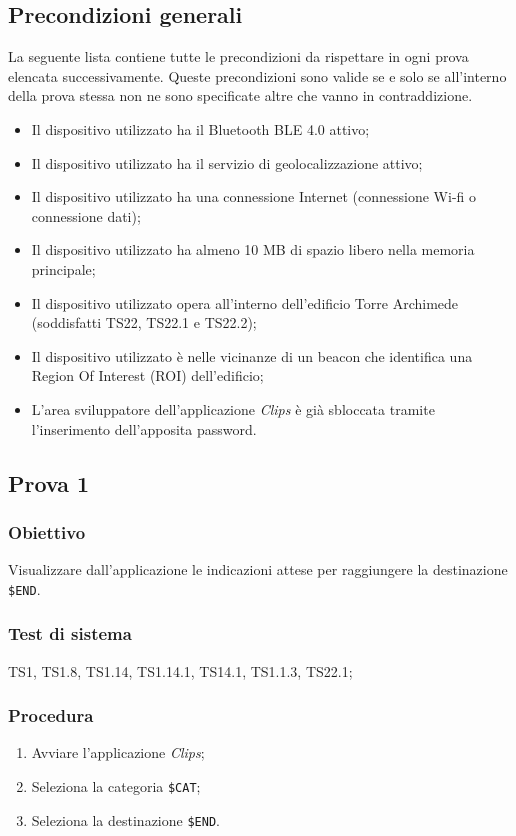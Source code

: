 \documentclass[../Sperimentazione.tex]{subfiles}
\begin{document}
\subsection{Precondizioni generali}
	La seguente lista contiene tutte le precondizioni da rispettare in ogni prova elencata successivamente. Queste precondizioni sono valide se e solo se all'interno della prova stessa non ne sono specificate altre che vanno in contraddizione.
	\begin{itemize}
		\item Il dispositivo utilizzato ha il Bluetooth BLE 4.0 attivo;
		\item Il dispositivo utilizzato ha il servizio di geolocalizzazione attivo;
		\item Il dispositivo utilizzato ha una connessione Internet (connessione Wi-fi o connessione dati);
		\item Il dispositivo utilizzato ha almeno 10 MB di spazio libero nella memoria principale;
		\item Il dispositivo utilizzato opera all'interno dell'edificio Torre Archimede (soddisfatti TS22, TS22.1 e TS22.2);
		\item Il dispositivo utilizzato è nelle vicinanze di un beacon che identifica una Region Of Interest (ROI) dell'edificio;
		\item L'area sviluppatore dell'applicazione \textit{Clips} è già sbloccata tramite l'inserimento dell'apposita password.
	\end{itemize}



\newpage
\subsection{Prova 1} %
\label{subsec:Prova1}	
	
	\subsubsection{Obiettivo}
		Visualizzare dall'applicazione le indicazioni attese per raggiungere la destinazione \verb|$END|.
		
	\subsubsection{Test di sistema}
		TS1, TS1.8,
		TS1.14, TS1.14.1,
		TS14.1,
		TS1.1.3,
		TS22.1;
		
	\subsubsection{Procedura}
		\begin{enumerate}
		\item Avviare l'applicazione \textit{Clips};
		\item Seleziona la categoria  \verb|$CAT|;
		\item Seleziona la destinazione  \verb|$END|.
		\end{enumerate}
	
\end{document}
